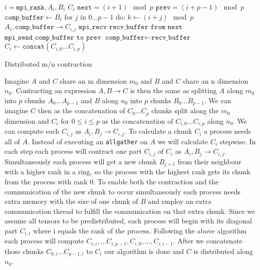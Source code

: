 \begin{algorithm}[ht]
        \begin{algorithmic}
        \Require $i = \texttt{mpi\_rank}, A_i, B_i$
        \Ensure $C_i$
        \State $\texttt{next} = (i+1) \mod p$
        \State $\texttt{prev} = (i+p-1) \mod p$
        \State $\texttt{comp\_buffer} \gets B_i$
        \State  $\text{for } j \text{ in } 0\dots p - 1 \text{ do:}$
        \State \indent $k \gets (i + j) \mod p$
        \State \indent {}
        \State \indent \indent $A_i, \texttt{comp\_buffer} \rightarrow C_{i,j}$
        \State \indent \indent $\texttt{mpi\_recv recv\_buffer from next}$
        \State \indent \indent $\texttt{mpi\_send comp\_buffer to prev}$
        \State \indent $\texttt{comp\_buffer} \gets \texttt{recv\_buffer}$
        \State $C_i \gets \texttt{concat}(C_{i,0}\dots C_{i,p})$
    \end{algorithmic}
    \caption{Distributed m/n contraction}
    \label{alg:m_n_pseudocode}
\end{algorithm}


Imagine $A$ and $C$ share an m dimension $m_0$ and $B$ and $C$ share an n dimension $n_0$.
Contracting an expression $A,B \rightarrow C$ is then the same as splitting $A$ along $m_0$ into $p$ chunks $A_0\dots A_{p-1}$ and $B$ along $n_0$ into $p$ chunks $B_0\dots B_{p-1}$.
We can imagine $C$ then as the concatenation of $C_0\dots C_p$ chunks split along the $m_0$ dimension and $C_i$ for $0 \leq i \leq p$ as the concatenation of $C_{i,0} \dots C_{i,p}$ along $n_0$.
We can compute each $C_{i,j}$ as $A_i,B_j \rightarrow C_{i,j}$.
To calculate a chunk $C_i$ a process needs all of $A$.
Instead of executing an \texttt{allgather} on $A$ we will calculate $C_i$ stepwise.
In each step each process will contract one part $C_{i,j}$ of $C_i$ as $A_i,B_j \rightarrow C_{i,j}$.
Simultaneously each process will get a new chunk $B_{j+1}$ from their neighbour with a higher rank in a ring, so the process with the highest rank gets its chunk from the process with rank 0.
To enable both the contraction and the communication of the new chunk to occur simultaneously each process needs extra memory with the size of one chunk of $B$ and employ an extra communication thread to fulfill the communication on that extra chunk.
Since we assume all tensors to be predistributed, each process will begin with its diagonal part $C_{i,i}$ where i equals the rank of the process.
Following the above algorithm each process will compute $C_{i,i}, \dots C_{i,p-1},C_{i,0},\dots,C_{i,i-1}$.
After we concatenate those chunks $C_{0,i}\dots C_{p-1,i}$ to $C_i$ our algorithm is done and $C$ is distributed along $n_0$.

